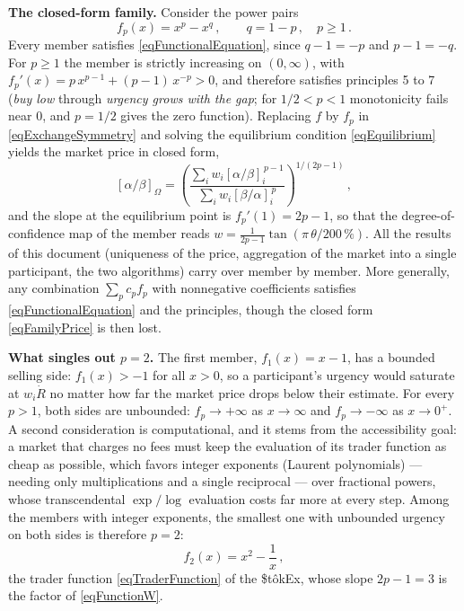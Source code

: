 \documentclass[letterpaper]{article}
\newcommand{\priceAB}{\left[\alpha / \beta\right]}
\newcommand{\priceBA}{\left[\beta / \alpha\right]}
\newcommand{\StokEx}{\$t\^{o}kEx}
\begin{document}
\textbf{The closed-form family.} Consider the power pairs
\begin{equation}
    f_p(x) = x^p - x^q\,, \qquad q = 1 - p\,, \quad p \geq 1\,. \label{eqTraderFamily}
\end{equation}
Every member satisfies \eqref{eqFunctionalEquation}, since $q - 1 = -p$ and $p - 1 = -q$. For $p \geq 1$ the member is strictly increasing on $(0, \infty)$, with $f_p'(x) = p\,x^{p-1} + (p-1)\,x^{-p} > 0$, and therefore satisfies principles 5 to 7 (\emph{buy low} through \emph{urgency grows with the gap}; for $1/2 < p < 1$ monotonicity fails near $0$, and $p = 1/2$ gives the zero function). Replacing $f$ by $f_p$ in \eqref{eqExchangeSymmetry} and solving the equilibrium condition \eqref{eqEquilibrium} yields the market price in closed form,
\begin{equation}
    \priceAB_\Omega = \left( \frac{\displaystyle \sum_i w_i \priceAB_i^{\,p-1}}{\displaystyle \sum_i w_i \priceBA_i^{\,p}} \right)^{1/(2p-1)}\,, \label{eqFamilyPrice}
\end{equation}
and the slope at the equilibrium point is $f_p'(1) = 2p - 1$, so that the degree-of-confidence map of the member reads $w = \frac{1}{2p-1} \tan\left(\pi\,\theta/200\,\%\right)$. All the results of this document (uniqueness of the price, aggregation of the market into a single participant, the two algorithms) carry over member by member. More generally, any combination $\sum_p c_p f_p$ with nonnegative coefficients satisfies \eqref{eqFunctionalEquation} and the principles, though the closed form \eqref{eqFamilyPrice} is then lost.

\textbf{What singles out $p = 2$.} The first member, $f_1(x) = x - 1$, has a bounded selling side: $f_1(x) > -1$ for all $x > 0$, so a participant's urgency would saturate at $w_i \dot{R}$ no matter how far the market price drops below their estimate. For every $p > 1$, both sides are unbounded: $f_p \to +\infty$ as $x \to \infty$ and $f_p \to -\infty$ as $x \to 0^+$. A second consideration is computational, and it stems from the accessibility goal: a market that charges no fees must keep the evaluation of its trader function as cheap as possible, which favors integer exponents (Laurent polynomials) --- needing only multiplications and a single reciprocal --- over fractional powers, whose transcendental $\exp/\log$ evaluation costs far more at every step. Among the members with integer exponents, the smallest one with unbounded urgency on both sides is therefore $p = 2$:
\begin{equation*}
    f_2(x) = x^2 - \frac{1}{x}\,,
\end{equation*}
the trader function \eqref{eqTraderFunction} of the \StokEx{}, whose slope $2p - 1 = 3$ is the factor of \eqref{eqFunctionW}.
\end{document}
